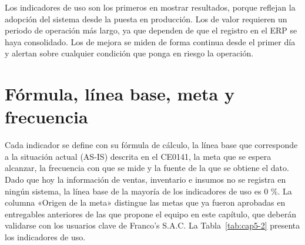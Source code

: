 Los indicadores de uso son los primeros en mostrar resultados, porque reflejan la adopción del sistema desde la puesta en producción. Los de valor requieren un periodo de operación más largo, ya que dependen de que el registro en el ERP se haya consolidado. Los de mejora se miden de forma continua desde el primer día y alertan sobre cualquier condición que ponga en riesgo la operación.

\section{Fórmula, línea base, meta y frecuencia}


Cada indicador se define con su fórmula de cálculo, la línea base que corresponde a la situación actual (AS-IS) descrita en el CE0141, la meta que se espera alcanzar, la frecuencia con que se mide y la fuente de la que se obtiene el dato. Dado que hoy la información de ventas, inventario e insumos no se registra en ningún sistema, la línea base de la mayoría de los indicadores de uso es 0 \%. La columna «Origen de la meta» distingue las metas que ya fueron aprobadas en entregables anteriores de las que propone el equipo en este capítulo, que deberán validarse con los usuarios clave de Franco's S.A.C. La Tabla~\ref{tab:cap5-2} presenta los indicadores de uso.


